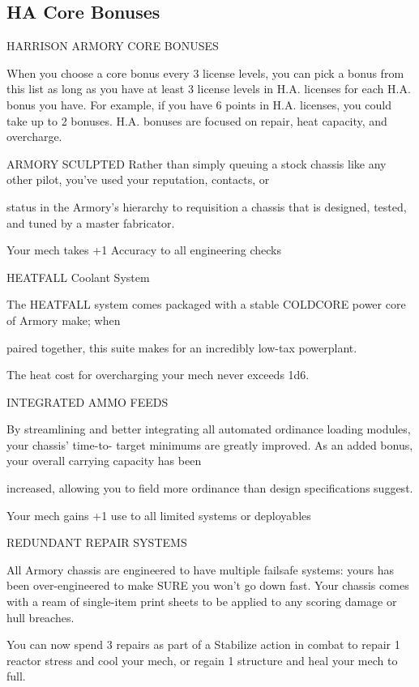 \subsection{HA Core Bonuses}

                           HARRISON ARMORY CORE BONUSES

When you choose a core bonus every 3 license levels, you can pick a bonus from this list as long
as you have at least 3 license levels in H.A. licenses for each H.A. bonus you have. For example,
if you have 6 points in H.A. licenses, you could take up to 2 bonuses. H.A. bonuses are focused
on repair, heat capacity, and overcharge.


ARMORY SCULPTED
Rather than simply queuing a stock chassis like any other pilot, you've used your reputation, contacts, or

status in the Armory's hierarchy to requisition a chassis that is designed, tested, and tuned by a master
fabricator.

Your mech takes +1 Accuracy to all engineering checks


HEATFALL Coolant System

The HEATFALL system comes packaged with a stable COLDCORE power core of Armory make; when

paired together, this suite makes for an incredibly low-tax powerplant.

The heat cost for overcharging your mech never exceeds 1d6.


INTEGRATED AMMO FEEDS

By streamlining and better integrating all automated ordinance loading modules, your chassis' time-to-
target minimums are greatly improved. As an added bonus, your overall carrying capacity has been

increased, allowing you to field more ordinance than design specifications suggest.

Your mech gains +1 use to all limited systems or deployables


REDUNDANT REPAIR SYSTEMS

All Armory chassis are engineered to have multiple failsafe systems: yours has been over-engineered to
make SURE you won't go down fast. Your chassis comes with a ream of single-item print sheets to be
applied to any scoring damage or hull breaches.

You can now spend 3 repairs as part of a Stabilize action in combat to repair 1 reactor stress and
cool your mech, or regain 1 structure and heal your mech to full.


